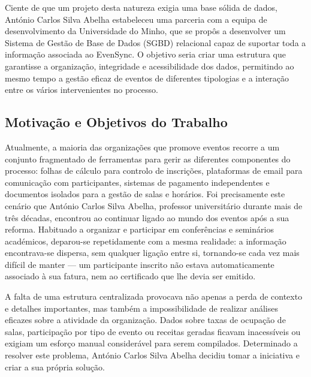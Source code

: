 \documentclass[runningheads]{llncs}
\begin{document}
                \vspace{0.3cm}
                Ciente de que um projeto desta natureza exigia uma base sólida de dados, António Carlos Silva Abelha estabeleceu uma parceria com a equipa de 
                desenvolvimento da Universidade do Minho, que se propôs a desenvolver um Sistema de Gestão de Base de Dados (SGBD) relacional capaz de 
                suportar toda a informação associada ao EvenSync. O objetivo seria criar uma estrutura que garantisse a organização, integridade e acessibilidade 
                dos dados, permitindo ao mesmo tempo a gestão eficaz de eventos de diferentes tipologias e a interação entre os vários intervenientes no processo.
                
                \subsection{Motivação e Objetivos do Trabalho}

                Atualmente, a maioria das organizações que promove eventos recorre a um conjunto fragmentado de ferramentas 
                para gerir as diferentes componentes do processo: folhas de cálculo para controlo de inscrições, plataformas 
                de email para comunicação com participantes, sistemas de pagamento independentes e documentos isolados para a 
                gestão de salas e horários. Foi precisamente este cenário que António Carlos Silva Abelha, professor universitário durante 
                mais de três décadas, encontrou ao continuar ligado ao mundo dos eventos após a sua reforma. Habituado a organizar 
                e participar em conferências e seminários académicos, deparou-se repetidamente com a mesma realidade: a informação 
                encontrava-se dispersa, sem qualquer ligação entre si, tornando-se cada vez mais difícil de manter — um participante 
                inscrito não estava automaticamente associado à sua fatura, nem ao certificado que lhe devia ser emitido.
                
                \vspace{0.3cm}
                A falta de uma estrutura centralizada provocava não apenas a perda de contexto e detalhes importantes, mas
                também a impossibilidade de realizar análises eficazes sobre a atividade da organização. Dados sobre taxas 
                de ocupação de salas, participação por tipo de evento ou receitas geradas ficavam inacessíveis ou exigiam 
                um esforço manual considerável para serem compilados. Determinado a resolver este problema, António Carlos Silva Abelha 
                decidiu tomar a iniciativa e criar a sua própria solução.
                
\end{document}
